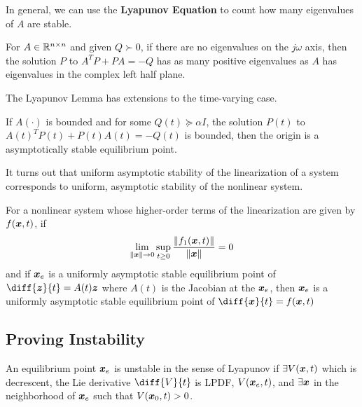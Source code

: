 In general, we can use the \textbf{Lyapunov Equation} to count how many
eigenvalues of $A$ are stable.
\begin{theorem}
	For $A\in\mathbb{R}^{n\times n}$ and given $Q \succ 0$, if there are no eigenvalues on
	the $j\omega$ axis, then the solution $P$ to $A^TP + PA = -Q$ has as many
	positive eigenvalues as $A$ has eigenvalues in the complex left half plane.
	\label{thm:tausskey-lemma}
\end{theorem}
The Lyapunov Lemma has extensions to the time-varying case.
\begin{theorem}
	If $A(\cdot)$ is bounded and for some $Q(t) \succeq \alpha I$, the solution
	$P(t)$ to $A(t)^TP(t) + P(t)A(t) = -Q(t)$ is bounded, then the origin is a
	asymptotically stable equilibrium point.
	\label{thm:tv-lyapuynov-lemma}
\end{theorem}
It turns out that uniform asymptotic stability of the linearization of a system
corresponds to uniform, asymptotic stability of the nonlinear system.
\begin{theorem}
	For a nonlinear system whose higher-order terms of the linearization are given
	by $f(\boldsymbol{x},t)$, if \[
		\lim_{\|\boldsymbol{x}\|\to 0}\sup_{t\geq 0} \frac{\|f_1(\boldsymbol{x},t)\|}{\|\boldsymbol{x}\|} =
		0
	\]
	and if $\boldsymbol{x}_e$ is a uniformly asymptotic stable equilibrium point of
	$\diff{\bs{z}}{t}=A(t)\bs{z}$ where $A(t)$ is the Jacobian at the $\boldsymbol{x}_e$,
	then $\boldsymbol{x}_e$ is a uniformly asymptotic stable
	equilibrium point of $\diff{\bs{x}}{t} = f(\bs{x},t)$
	\label{thm:indirect-lyapunov}
\end{theorem}
\subsection{Proving Instability}
\begin{theorem}
	An equilibrium point $\boldsymbol{x}_e$ is unstable in the sense of Lyapunov if
	$\exists V(\boldsymbol{x},t)$ which is decrescent, the Lie derivative $\diff{V}{t}$ is
	LPDF, $V(\boldsymbol{x}_e, t)$, and $\exists \boldsymbol{x}$ in the neighborhood of $\boldsymbol{x}_e$
	such that $V(\boldsymbol{x}_0, t) > 0$.
	\label{thm:lyapunov-instability}
\end{theorem}


